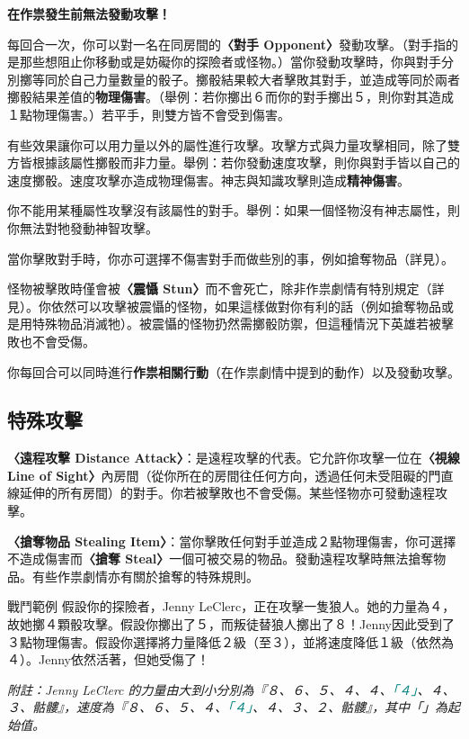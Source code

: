 \textbf{在作祟發生前無法發動攻擊！}

每回合一次，你可以對一名在同房間的\textbf{〈對手 Opponent〉}發動攻擊。（對手指的是那些想阻止你移動或是妨礙你的探險者或怪物。）當你發動攻擊時，你與對手分別擲等同於自己力量數量的骰子。擲骰結果較大者擊敗其對手，並造成等同於兩者擲骰結果差值的\textbf{物理傷害}。（舉例：若你擲出６而你的對手擲出５，則你對其造成１點物理傷害。）若平手，則雙方皆不會受到傷害。

有些效果讓你可以用力量以外的屬性進行攻擊。攻擊方式與力量攻擊相同，除了雙方皆根據該屬性擲骰而非力量。舉例：若你發動速度攻擊，則你與對手皆以自己的速度擲骰。速度攻擊亦造成物理傷害。神志與知識攻擊則造成\textbf{精神傷害}。

你不能用某種屬性攻擊沒有該屬性的對手。舉例：如果一個怪物沒有神志屬性，則你無法對牠發動神智攻擊。

當你擊敗對手時，你亦可選擇不傷害對手而做些別的事，例如搶奪物品（詳見）。

怪物被擊敗時僅會被\textbf{〈震懾 Stun〉}而不會死亡，除非作祟劇情有特別規定（詳見）。你依然可以攻擊被震懾的怪物，如果這樣做對你有利的話（例如搶奪物品或是用特殊物品消滅牠）。被震懾的怪物扔然需擲骰防禦，但這種情況下英雄若被擊敗也不會受傷。

你每回合可以同時進行\textbf{作祟相關行動}（在作祟劇情中提到的動作）以及發動攻擊。


\subsection{特殊攻擊} \label{ssec:special-attacks}

\textbf{〈遠程攻擊 Distance Attack〉}：是遠程攻擊的代表。它允許你攻擊一位在\textbf{〈視線 Line of Sight〉}內房間（從你所在的房間往任何方向，透過任何未受阻礙的門直線延伸的所有房間）的對手。你若被擊敗也不會受傷。某些怪物亦可發動遠程攻擊。

\textbf{〈搶奪物品 Stealing Item〉}：當你擊敗任何對手並造成２點物理傷害，你可選擇不造成傷害而\textbf{〈搶奪 Steal〉}一個可被交易的物品。發動遠程攻擊時無法搶奪物品。有些作祟劇情亦有關於搶奪的特殊規則。

\begin{RuleBox}{戰鬥範例}
假設你的探險者，Jenny LeClerc，正在攻擊一隻狼人。她的力量為４，故她擲４顆骰攻擊。假設你擲出了５，而叛徒替狼人擲出了８！Jenny因此受到了３點物理傷害。假設你選擇將力量降低２級（至３），並將速度降低１級（依然為４）。Jenny依然活著，但她受傷了！

\emph{附註：Jenny LeClerc 的力量由大到小分別為『８、６、５、４、４、\textcolor{teal}{「４」}、４、３、骷髏』，速度為『８、６、５、４、\textcolor{teal}{「４」}、４、３、２、骷髏』，其中「」為起始值。}
\end{RuleBox}
